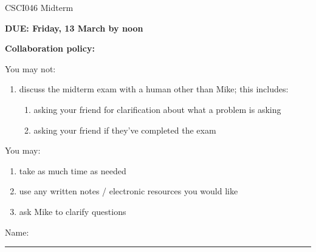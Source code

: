 \documentclass[12pt]{article}
\theoremstyle{definition}
\begin{document}
\begin{center}
    {
\Large
CSCI046 Midterm
}


    \vspace{0.1in}
    \textbf{DUE: Friday, 13 March by noon}

    \vspace{0.1in}
\end{center}

\noindent
\textbf{Collaboration policy:} 

\vspace{0.1in}
\noindent
You may not:
\begin{enumerate}
    \item discuss the midterm exam with a human other than Mike; this includes:
        \begin{enumerate}
            \item asking your friend for clarification about what a problem is asking
            \item asking your friend if they've completed the exam
        \end{enumerate}
\end{enumerate}

\noindent
You may:
\begin{enumerate}
    \item take as much time as needed
    \item use any written notes / electronic resources you would like
    \item ask Mike to clarify questions
\end{enumerate}


\vspace{0.15in}

\vspace{0.25in}
\noindent
Name: 

\noindent
\rule{\textwidth}{0.1pt}
\vspace{0.15in}
\end{document}
